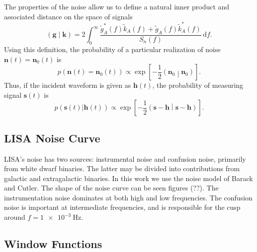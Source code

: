 \documentclass[a4paper, 11pt, titlepage, twoside]{report}
\newcommand{\recip}[1]{\ensuremath{\frac{1}{#1}}}
\newcommand{\innerprod}[2]{\ensuremath{\left({#1}\middle|{#2}\right)}}
\newcommand{\dd}{\ensuremath{\mathrm{d}}}
\newcommand{\intd}[4]{\ensuremath{\int_{#1}^{#2}{#3}\,\dd{#4}}}
\begin{document}
The properties of the noise allow us to define a natural inner product and associated distance on the space of signals\cite{Cutler1994}
\begin{equation}
\innerprod{\boldsymbol{g}}{\boldsymbol{k}} = 2\intd{0}{\infty}{\frac{\tilde{g}_A^*(f)\tilde{k}_A(f) + \tilde{g}_A(f)\tilde{k}_A^*(f)}{S_n(f)}}{f}.
\end{equation}
Using this definition, the probability of a particular realization of noise $\boldsymbol{n}(t) = \boldsymbol{n}_0(t)$ is
\begin{equation}
p(\boldsymbol{n}(t) = \boldsymbol{n}_0(t)) \propto \exp\left[-\recip{2}\innerprod{\boldsymbol{n}_0}{\boldsymbol{n}_0}\right].
\end{equation}
Thus, if the incident waveform is given as $\boldsymbol{h}(t)$, the probability of measuring signal $\boldsymbol{s}(t)$ is
\begin{equation}
p(\boldsymbol{s}(t)|\boldsymbol{h}(t)) \propto \exp\left[-\recip{2}\innerprod{\boldsymbol{s}-\boldsymbol{h}}{\boldsymbol{s}-\boldsymbol{h}}\right].
\label{eq:sig_prob}
\end{equation}

\subsection{LISA Noise Curve}\label{sec:Noise}

LISA's noise has two sources: instrumental noise and confusion noise, primarily from white dwarf binaries. The latter may be divided into contributions from galactic and extragalactic binaries. In this work we use the noise model of Barack and Cutler\cite{Barack2004}. The shape of the noise curve can be seen figures (??). The instrumentation noise dominates at both high and low frequencies. The confusion noise is important at intermediate frequencies, and is responsible for the cusp around $f = \SI{1e-3}{\Hz}$.

\subsection{Window Functions}
\end{document}
